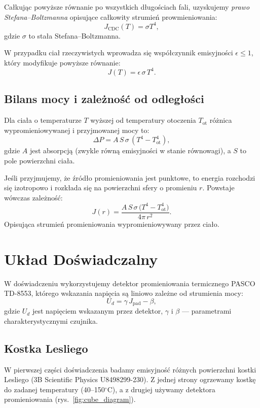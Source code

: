 \documentclass[12pt]{article}
\begin{document}
Całkując powyższe równanie po wszystkich długościach fali, uzyskujemy \emph{prawo Stefana–Boltzmanna} opisujące całkowity strumień prowmieniowania:
\begin{equation}
	J_{\mathrm{CDC}}(T) = \sigma T^4,
	\label{eq:boltzman_law}
\end{equation}
gdzie $\sigma$ to stała Stefana–Boltzmanna. 

W przypadku ciał rzeczywistych wprowadza się współczynnik emisyjności $\epsilon \le 1$, który modyfikuje powyższe równanie:
\begin{equation}
	J(T) = \epsilon\,\sigma\,T^4.
	\label{eq:boltzman_law_epsilon}
\end{equation}

\subsection{Bilans mocy i zależność od odległości}
Dla ciała o temperaturze $T$ wyższej od temperatury otoczenia $T_{\mathrm{ot}}$ różnica wypromieniowywanej i przyjmowanej mocy to:
\begin{equation}
	\Delta P = A\,S\,\sigma\,(T^4 - T_{\mathrm{ot}}^4),
	\label{eq:power_loss}
\end{equation}
gdzie $A$ jest absorpcją (zwykle równą emisyjności w stanie równowagi), a $S$ to pole powierzchni ciała.

Jeśli przyjmujemy, że źródło promieniowania jest punktowe, to energia rozchodzi się izotropowo i rozkłada się na powierzchni sfery o promieniu $r$. Powstaje wówczas zależność:
\begin{equation}
	J(r) = \frac{A\,S\,\sigma\,\bigl(T^4 - T_{\mathrm{ot}}^4\bigr)}{4\pi\,r^2}.
	\label{eq:power_flux}
\end{equation}
Opisująca strumień promieniowania wypromieniowywany przez ciało.

\section{Układ Doświadczalny}
W doświadczeniu wykorzystujemy detektor promieniowania termicznego PASCO TD-8553, którego wskazania napięcia są liniowo zależne od strumienia mocy:
\begin{equation}
	U_d = \gamma \,J_{\mathrm{pad}} - \beta,
	\label{eq:measurment_device}
\end{equation}
gdzie $U_d$ jest napięciem wskazanym przez detektor, $\gamma$ i $\beta$ — parametrami charakterystycznymi czujnika.

\subsection{Kostka Lesliego}
W pierwszej części doświadczenia badamy emisyjność różnych powierzchni kostki Lesliego (3B Scientific Physics U8498299-230). Z jednej strony ogrzewamy kostkę do zadanej temperatury (40--150$^\circ$C), a z drugiej używamy detektora promieniowania (rys.~\ref{fig:cube_diagram}).
\end{document}

